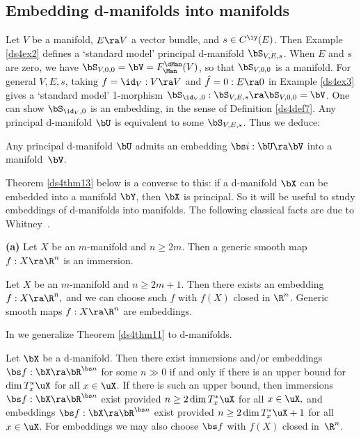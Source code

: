 \documentclass{article}
\begin{document}
\subsection{Embedding d-manifolds into manifolds}
\label{ds47}

Let $V$ be a manifold, $E\ra V$ a vector bundle, and $s\in
C^\iy(E)$. Then Example \ref{ds4ex2} defines a `standard model'
principal d-manifold $\bS_{V,E,s}$. When $E$ and $s$ are zero, we
have $\bS_{V,0,0}=\bV=F_\Man^\dMan(V)$, so that $\bS_{V,0,0}$ is a
manifold. For general $V,E,s$, taking $f=\id_V:V\ra V$ and $\hat
f=0:E\ra 0$ in Example \ref{ds4ex3} gives a `standard model'
1-morphism $\bS_{\id_V,0}:\bS_{V,E,s}\ra \bS_{V,0,0}=\bV$. One can
show $\bS_{\id_V,0}$ is an embedding, in the sense of Definition
\ref{ds4def7}. Any principal d-manifold $\bU$ is equivalent to some
$\bS_{V,E,s}$. Thus we deduce:

\begin{lem} Any principal d-manifold\/ $\bU$ admits an embedding\/
$\bs i:\bU\ra\bV$ into a manifold\/~$\bV$.
\label{ds4lem1}
\end{lem}

Theorem \ref{ds4thm13} below is a converse to this: if a d-manifold
$\bX$ can be embedded into a manifold $\bY$, then $\bX$ is
principal. So it will be useful to study embeddings of d-manifolds
into manifolds. The following classical facts are due to
Whitney~\cite{Whit}.

\begin{thm}{\bf(a)} Let\/ $X$ be an $m$-manifold and\/ $n\ge 2m$.
Then a generic smooth map $f:X\ra\R^n$ is an
immersion.
\smallskip

 Let\/ $X$ be an $m$-manifold and\/ $n\ge 2m+1$.
Then there exists an embedding $f:X\ra\R^n,$ and we can choose
such\/ $f$ with\/ $f(X)$ closed in\/ $\R^n$. Generic smooth maps\/
$f:X\ra\R^n$ are embeddings.
\label{ds4thm11}
\end{thm}

In \cite[\S 4.4]{Joyc6} we generalize Theorem \ref{ds4thm11} to
d-manifolds.

\begin{thm} Let\/ $\bX$ be a d-manifold. Then there exist
immersions and/or embeddings $\bs f:\bX\ra\bR^{\bs n}$ for some
$n\gg 0$ if and only if there is an upper bound for\/ $\dim
T^*_x\uX$ for all\/ $x\in\uX$. If there is such an upper bound, then
immersions $\bs f:\bX\ra\bR^{\bs n}$ exist provided\/ $n\ge 2\dim
T_x^*\uX$ for all\/ $x\in\uX,$ and embeddings $\bs f:\bX\ra\bR^{\bs
n}$ exist provided\/ $n\ge 2\dim T_x^*\uX+1$ for all\/ $x\in\uX$.
For embeddings we may also choose $\bs f$ with\/ $f(X)$ closed
in\/~$\R^n$.
\label{ds4thm12}
\end{thm}
\end{document}
